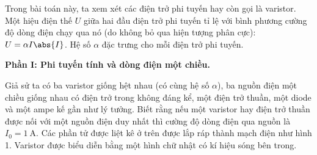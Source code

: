 \begin{vd} %
Trong bài toán này, ta xem xét các điện trở phi tuyến hay còn gọi là varistor. Một hiệu điện thế $U$ giữa hai đầu điện trở phi tuyến tỉ lệ với bình phương cường độ dòng điện chạy qua nó (do không bỏ qua hiện tượng phân cực): $U = \alpha I \abs{I}$. Hệ số $\alpha$ đặc trưng cho mỗi điện trở phi tuyến.
\begin{center}
    \bf Phần I: Phi tuyến tính và dòng điện một chiều.
\end{center}
 Giả sử ta có ba varistor giống hệt nhau (có cùng hệ số $\alpha$), ba nguồn điện một chiều giống nhau có điện trở trong không đáng kể, một điện trở thuần, một diode và một ampe kế gần như lý tưởng. Biết rằng nếu một varistor hay điện trở thuần được nối với một nguồn điện duy nhất thì cường độ dòng điện qua nguồn là $I_0 = 1~\mathrm{A}$. Các phần tử được liệt kê ở trên được lắp ráp thành mạch điện như hình 1. Varistor được biểu diễn bằng một hình chữ nhật có kí hiệu sóng bên trong.   
 \begin{center}

\begin{tikzpicture}[x=0.75pt,y=0.75pt,yscale=-1,xscale=1]


\end{tikzpicture}
\end{center}
\end{vd}
